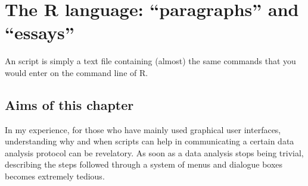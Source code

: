 \documentclass[krantz2]{krantz}\usepackage{knitr}%
\newcommand{\href}[2]{\emph{#2} (\url{#1})}
\begin{document}

\frontmatter

\maketitle

\newpage


\setcounter{page}{7} %
\tableofcontents
%

\listoffigures
\listoftables
%
%

\mainmatter










\chapter{The R language: ``paragraphs'' and ``essays''}\label{chap:R:scripts}

\begin{VF}
An \Rlang script is simply a text file containing (almost) the same commands that you would enter on the command line of R.

\end{VF}


\section{Aims of this chapter}

In my experience, for those who have mainly used graphical user interfaces, understanding why and when scripts can help in communicating a certain data analysis protocol can be revelatory. As soon as a data analysis stops being trivial, describing the steps followed through a system of menus and dialogue boxes becomes extremely tedious.
\end{document}
